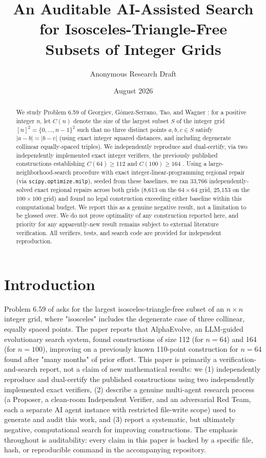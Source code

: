 \documentclass[11pt]{article}
\title{An Auditable AI-Assisted Search for Isosceles-Triangle-Free \\ Subsets of Integer Grids}
\author{Anonymous Research Draft}
\date{August 2026}
\begin{document}
\maketitle

\begin{abstract}
We study Problem 6.59 of Georgiev, G\'omez-Serrano, Tao, and Wagner
\cite{georgiev2025mathematical}: for a positive integer $n$, let $C(n)$ denote the
size of the largest subset $S$ of the integer grid $[n]^2=\{0,\dots,n-1\}^2$ such
that no three distinct points $a,b,c\in S$ satisfy $|a-b|=|b-c|$ (using exact
integer squared distances, and including degenerate collinear equally-spaced
triples). We independently reproduce and dual-certify, via two independently
implemented exact integer verifiers, the previously published constructions
establishing $C(64)\ge 112$ and $C(100)\ge 164$ \cite{georgiev2025mathematical,
alphaevolverepo}. Using a large-neighborhood-search procedure with exact
integer-linear-programming regional repair (via \texttt{scipy.optimize.milp}),
seeded from these baselines, we ran 33{,}766 independently-solved exact regional
repairs across both grids (8{,}613 on the $64\times64$ grid, 25{,}153 on the
$100\times100$ grid) and found no legal construction exceeding either baseline
within this computational budget. We report this as a genuine negative result, not
a limitation to be glossed over. We do not prove optimality of any construction
reported here, and priority for any apparently-new result remains subject to
external literature verification. All verifiers, tests, and search code are
provided for independent reproduction.
\end{abstract}

\section{Introduction}

Problem 6.59 of \cite{georgiev2025mathematical} asks for the largest
isosceles-triangle-free subset of an $n \times n$ integer grid, where "isosceles"
includes the degenerate case of three collinear, equally spaced points. The paper
reports that AlphaEvolve, an LLM-guided evolutionary search system, found
constructions of size 112 (for $n=64$) and 164 (for $n=100$), improving on a
previously known 110-point construction for $n=64$ found after "many months" of
prior effort. This paper is primarily a verification-and-search report, not a claim
of new mathematical results: we (1) independently reproduce and dual-certify the
published constructions using two independently implemented exact verifiers, (2)
describe a genuine multi-agent research process (a Proposer, a clean-room
Independent Verifier, and an adversarial Red Team, each a separate AI agent
instance with restricted file-write scope) used to generate and audit this work, and
(3) report a systematic, but ultimately negative, computational search for
improving constructions. The emphasis throughout is auditability: every claim in
this paper is backed by a specific file, hash, or reproducible command in the
accompanying repository.
\end{document}
